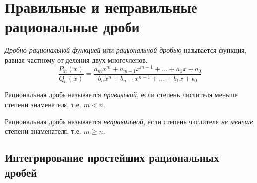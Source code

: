 \section{Правильные и неправильные рациональные дроби}

\begin{definition}
  \textit{Дробно-рациональной функцией} или \textit{рациональной дробью} называется функция, равная частному от деления двух многочленов. \[
    \frac{P_m(x)}{Q_n(x)} = \frac{a_m x^m + a_{m-1} x^{m-1} + \ldots + a_1 x + a_0}{b_n x^n + b_{n-1} x^{n-1} + \ldots + b_1 x + b_0}
  \] 
\end{definition}

\begin{definition}
  Рациональная дробь называется \textit{правильной}, если степень числителя меньше степени знаменателя, т.е. $m < n$. 
\end{definition}

\begin{definition}
  Рациональная дробь называется \textit{неправильной}, если степень числителя \textit{не меньше} степени знаменателя, т.е. $m \ge n$.
\end{definition}

\subsection{Интегрирование простейших рациональных дробей}


